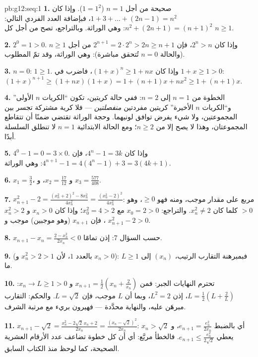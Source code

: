 \begin{solution}{pb:g12:seq:1}
\textbf{1.} صحيحة من أجل $n = 1$ ($1 = 1^2$). وإذا كان
$1 + 3 + \dots + (2n - 1) = n^2$، فبإضافة العدد الفردي
التالي: $n^2 + (2n + 1) = (n + 1)^2$: وهي الوراثة. وبالتراجع،
تصح من أجل كل $n \geq 1$.

\textbf{2.} $2^0 = 1 > 0$. وإذا كان $2^n > n$، فإن
$2^{n+1} = 2 \cdot 2^n > 2n \geq n + 1$ من أجل $n \geq 1$ (والحالة
$n = 0$ تُتحقق مباشرة): وهي الوراثة، وقد تمّ المطلوب.

\textbf{3.} $n = 0$: $1 \geq 1$. وإذا كان
$(1 + x)^n \geq 1 + nx$، فاضرب في $1 + x \geq 1 > 0$:
$(1 + x)^{n+1} \geq (1 + nx)(1 + x) = 1 + (n + 1)x + nx^2
\geq 1 + (n + 1)x$.

\textbf{4.} الخطوة من $n = 1$ إلى $n = 2$: ففي حالة كريتين،
تكون ``الكريات $n$ الأولى'' و``الكريات $n$ الأخيرة'' كريتين
مفردتين \emph{منفصلتين} --- فلا كرية مشتركة تجسر بين
المجموعتين، ولا شيء يفرض توافق لونيهما. وحجة
الوراثة تقتضي ضمنًا أن تتقاطع المجموعتان،
وهذا لا يصح إلا من $n \geq 2$؛ ومع الحالة الابتدائية $n = 1$ لا تنطلق
السلسلة أبدًا.

\textbf{5.} $4^0 - 1 = 0 = 3 \times 0$. وإذا كان $4^n - 1 = 3k$،
فإن $4^{n+1} - 1 = 4(4^n - 1) + 3 = 3(4k + 1)$: وهي الوراثة.

\textbf{6.} $x_1 = \frac32$، و $x_2 = \frac{17}{12}$،
و $x_3 = \frac{577}{408}$.

\textbf{7.} $x_{n+1}^2 - 2 = \frac{(x_n^2 + 2)^2 - 8x_n^2}
{4x_n^2} = \frac{(x_n^2 - 2)^2}{4 x_n^2}$: مربع على
مقدار موجب، ومنه فهو $\geq 0$، وهو $> 0$ كلما كان $x_n^2 \neq 2$.
والتراجع: $x_0 = 2 > 0$ مع $x_0^2 = 4 > 2$؛ وإذا كان $x_n > 0$
و $x_n^2 > 2$، فإن $x_{n+1}$ (وهو  موجبين)
موجب و $x_{n+1}^2 - 2 > 0$.

\textbf{8.} $x_{n+1} - x_n = \frac{2 - x_n^2}{2x_n} < 0$ حسب
السؤال 7: إذن  تمامًا.

\textbf{9.}   (بالعدد $1$، لأن
$x_n^2 > 2 > 1$ و $x_n > 0$): فبمبرهنة التقارب
الرتيب،  $(x_n)$ إلى $L \geq 1$ ما.

\textbf{10.} تحترم النهايات الجبر: فمن
$x_{n+1} = \frac12\left(x_n + \frac{2}{x_n}\right)$ و
$x_n \to L \geq 1 > 0$:
$L = \frac12\left(L + \frac2L\right)$، إذن $L^2 = 2$، وبما أن $L$
موجب، فإن $L = \sqrt2$. والحكم: التقارب مبرهَن عليه،
والنهاية محدَّدة --- فهيرون بريء مع مرتبة الشرف.

\textbf{11.} $x_{n+1} - \sqrt2 = \frac{x_n^2 - 2\sqrt2\,x_n +
2}{2x_n} = \frac{(x_n - \sqrt2)^2}{2x_n}$: أي بالضبط
$e_{n+1} = \frac{e_n^2}{2x_n}$، و $x_n > \sqrt2$ يعطي
$e_{n+1} \leq \frac{e_n^2}{2\sqrt2}$. فالخطأ مربَّع: أي أن كل خطوة
تضاعف عدد الأرقام العشرية الصحيحة، كما لوحظ منذ
الكتاب السابق.


\end{solution}

